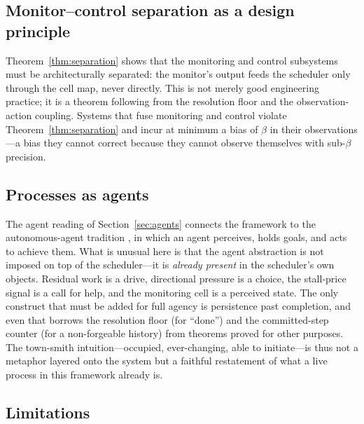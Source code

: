 \documentclass[11pt,twocolumn,a4paper]{article}
\theoremstyle{plain}
\theoremstyle{definition}
\theoremstyle{remark}
\newcommand{\floor}{\beta}
\begin{document}
\subsection{Monitor--control separation as a design principle}

Theorem~\ref{thm:separation} shows that the monitoring and control subsystems must be architecturally separated: the monitor's output feeds the scheduler only through the cell map, never directly. This is not merely good engineering practice; it is a theorem following from the resolution floor and the observation-action coupling. Systems that fuse monitoring and control violate Theorem~\ref{thm:separation} and incur at minimum a bias of $\floor$ in their observations---a bias they cannot correct because they cannot observe themselves with sub-$\floor$ precision.

\subsection{Processes as agents}

The agent reading of Section~\ref{sec:agents} connects the framework to the
autonomous-agent tradition \cite{russell2020}, in which an agent perceives, holds
goals, and acts to achieve them. What is unusual here is that the agent abstraction
is not imposed on top of the scheduler---it is \emph{already present} in the
scheduler's own objects. Residual work is a drive, directional pressure is a choice,
the stall-price signal is a call for help, and the monitoring cell is a perceived
state. The only construct that must be added for full agency is persistence past
completion, and even that borrows the resolution floor (for ``done'') and the
committed-step counter (for a non-forgeable history) from theorems proved for other
purposes. The town-smith intuition---occupied, ever-changing, able to initiate---is
thus not a metaphor layered onto the system but a faithful restatement of what a
live process in this framework already is.

\subsection{Limitations}
\end{document}
